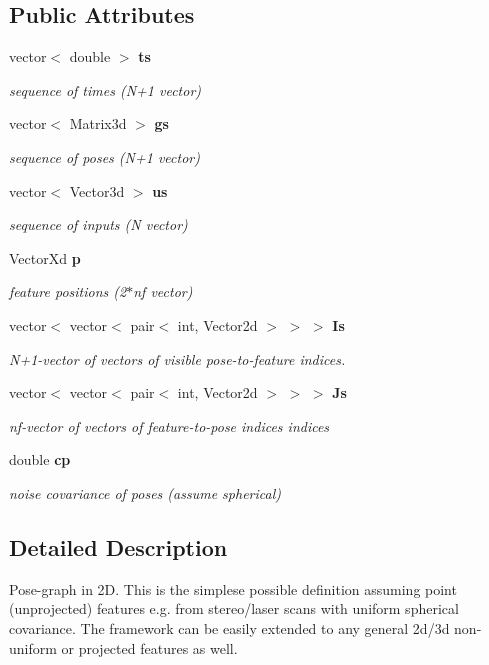 \subsection*{\-Public \-Attributes}
\begin{DoxyCompactItemize}
\item 
vector$<$ double $>$ {\bf ts}
\begin{DoxyCompactList}\small\item\em sequence of times (\-N+1 vector) \end{DoxyCompactList}\item 
vector$<$ \-Matrix3d $>$ {\bf gs}
\begin{DoxyCompactList}\small\item\em sequence of poses (\-N+1 vector) \end{DoxyCompactList}\item 
vector$<$ \-Vector3d $>$ {\bf us}
\begin{DoxyCompactList}\small\item\em sequence of inputs (\-N vector) \end{DoxyCompactList}\item 
\-Vector\-Xd {\bf p}
\begin{DoxyCompactList}\small\item\em feature positions (2$\ast$nf vector) \end{DoxyCompactList}\item 
vector$<$ vector$<$ pair$<$ int, \*
\-Vector2d $>$ $>$ $>$ {\bf \-Is}
\begin{DoxyCompactList}\small\item\em \-N+1-\/vector of vectors of visible pose-\/to-\/feature indices. \end{DoxyCompactList}\item 
vector$<$ vector$<$ pair$<$ int, \*
\-Vector2d $>$ $>$ $>$ {\bf \-Js}
\begin{DoxyCompactList}\small\item\em nf-\/vector of vectors of feature-\/to-\/pose indices indices \end{DoxyCompactList}\item 
double {\bf cp}
\begin{DoxyCompactList}\small\item\em noise covariance of poses (assume spherical) \end{DoxyCompactList}\end{DoxyCompactItemize}


\subsection{\-Detailed \-Description}
\-Pose-\/graph in 2\-D. \-This is the simplese possible definition assuming point (unprojected) features e.\-g. from stereo/laser scans with uniform spherical covariance. \-The framework can be easily extended to any general 2d/3d non-\/uniform or projected features as well. 

